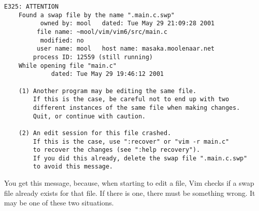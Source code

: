 \begin{Verbatim}[samepage=true]
        E325: ATTENTION 
    Found a swap file by the name ".main.c.swp" 
          owned by: mool   dated: Tue May 29 21:09:28 2001 
         file name: ~mool/vim/vim6/src/main.c 
          modified: no 
         user name: mool   host name: masaka.moolenaar.net 
        process ID: 12559 (still running) 
    While opening file "main.c" 
             dated: Tue May 29 19:46:12 2001 
 
    (1) Another program may be editing the same file. 
        If this is the case, be careful not to end up with two 
        different instances of the same file when making changes. 
        Quit, or continue with caution. 
 
    (2) An edit session for this file crashed. 
        If this is the case, use ":recover" or "vim -r main.c" 
        to recover the changes (see ":help recovery"). 
        If you did this already, delete the swap file ".main.c.swp" 
        to avoid this message. 
\end{Verbatim}

You get this message, because, when starting to edit a file, Vim checks if a swap file already exists for that file.
If there is one, there must be something wrong.
It may be one of these two situations.

